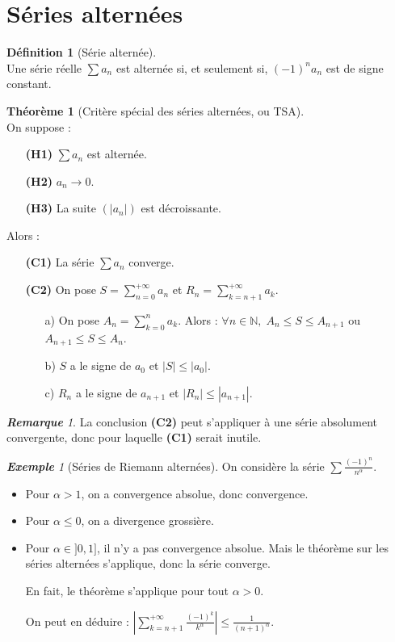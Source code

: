 \documentclass[12pt]{book}
\let\ensembleNombre\mathbb
\newcommand*\N{\ensuremath{\ensembleNombre{N}}}
\theoremstyle{definition}
\newtheorem*{defi}{Définition}
\newtheorem{thme}{Théorème}[chapter]
\theoremstyle{remark}
\newtheorem*{rem}{\textbf{Remarque}}
\newtheorem*{ex}{\textbf{Exemple}}
\newenvironment{fdef}
  {\begin{mdframed}[roundcorner=10pt, linewidth=1pt]\begin{defi}}
  {\end{defi}\end{mdframed}}
\newenvironment{fthme}
  {\begin{mdframed}[roundcorner=10pt, linewidth=2pt]\begin{thme}}
  {\end{thme}\end{mdframed}}
\begin{document}
	\section{Séries alternées}
	\begin{fdef}[Série alternée]\mbox{~}\\
	Une série réelle $\sum a_n$ est alternée si, et seulement si, $(-1)^na_n$ est de signe constant.
	\end{fdef}
	
	\begin{fthme}[Critère spécial des séries alternées, ou TSA]\mbox{~}\\
	On suppose : 
		\begin{itemize}
		\item[\textbf{(H1)}] $\sum a_n$ est alternée.
		\item[\textbf{(H2)}] $a_n \longrightarrow 0$.
		\item[\textbf{(H3)}] La suite $(|a_n|)$ est décroissante.
		\end{itemize}
		
	\noindent Alors :
		\begin{itemize}
		\item[\textbf{(C1)}] La série $\sum a_n$ converge.
		\item[\textbf{(C2)}] On pose $S = \sum_{n=0}^{+\infty} a_n$ et $R_n = \sum_{k=n+1}^{+\infty} a_k$.
			\begin{itemize}
			\item[a)] On pose $A_n = \sum_{k=0}^n a_k$. Alors : $\forall n \in \N,\; A_n \leq S \leq A_{n+1}$ ou $A_{n+1} \leq S \leq A_n$.
			\item[b)] $S$ a le signe de $a_0$ et $|S| \leq |a_0|$.
			\item[c)] $R_n$ a le signe de $a_{n+1}$ et $|R_n| \leq |a_{n+1}|$.
			\end{itemize}
		\end{itemize}
	\end{fthme}
	
	\begin{rem}
	La conclusion \textbf{(C2)} peut s'appliquer à une série absolument convergente, donc pour laquelle \textbf{(C1)} serait inutile.
	\end{rem}
	
	\begin{ex}[Séries de Riemann alternées]
	On considère la série $\sum \frac{(-1)^n}{n^\alpha}$.
	
	\begin{itemize}
	\item Pour $\alpha > 1$, on a convergence absolue, donc convergence.
	\item Pour $\alpha \leq 0$, on a divergence grossière.
	\item Pour $\alpha \in ]0, 1]$, il n'y a pas convergence absolue. Mais le théorème sur les séries alternées s'applique, donc la série converge. 
	
	En fait, le théorème s'applique pour tout $\alpha > 0$. 
	
	On peut en déduire : $\left| \sum_{k=n+1}^{+\infty} \frac{(-1)^k}{k^\alpha} \right| \leq \frac{1}{(n+1)^\alpha}$.
	\end{itemize}
	\end{ex}
	
\end{document}
